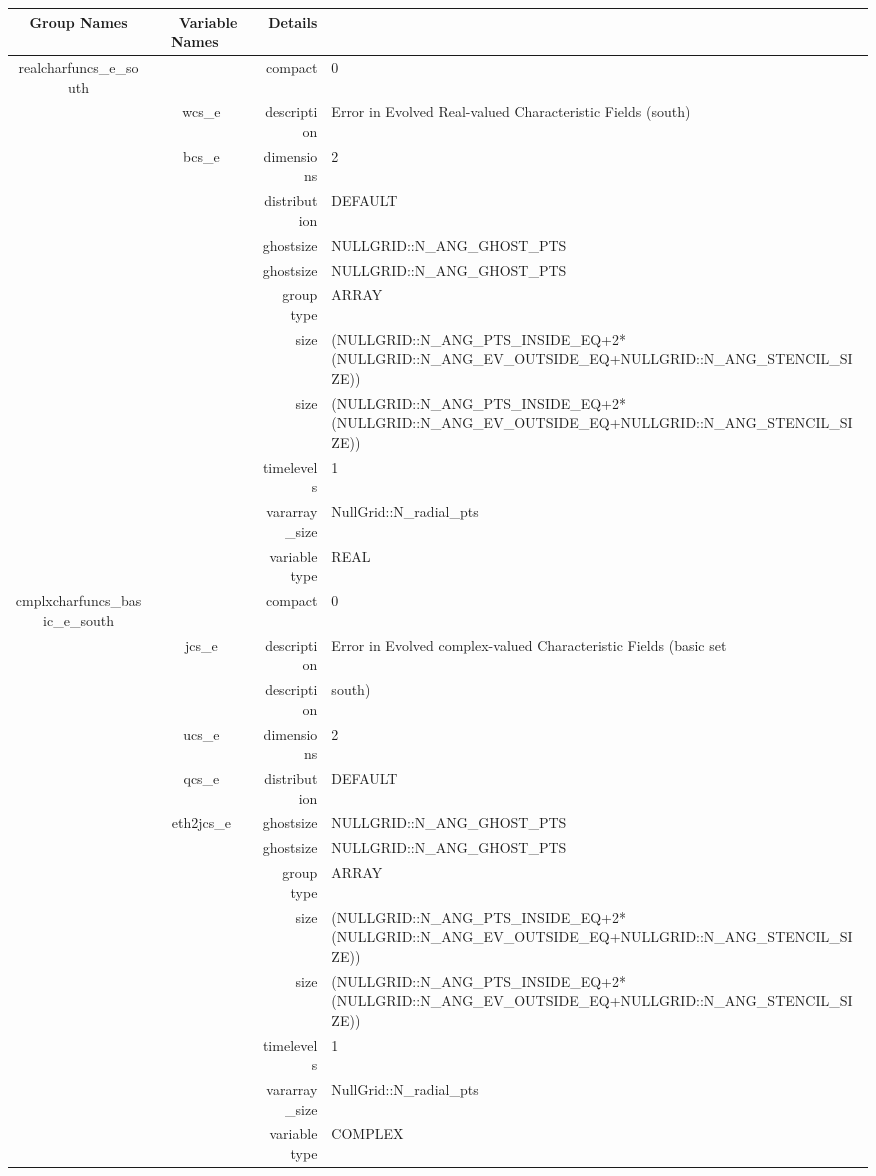 \begin{tabular*}{150mm}{|c|c@{\extracolsep{\fill}}|rl|} \hline 
~ {\bf Group Names} ~ & ~ {\bf Variable Names} ~  &{\bf Details} ~ & ~ \\ 
\hline 
realcharfuncs\_e\_south &  & compact & 0 \\ 
 & wcs\_e & description & Error in Evolved Real-valued Characteristic Fields (south) \\ 
 & bcs\_e & dimensions & 2 \\ 
 &  & distribution & DEFAULT \\ 
 &  & ghostsize & NULLGRID::N\_ANG\_GHOST\_PTS \\ 
& ~ & ghostsize & NULLGRID::N\_ANG\_GHOST\_PTS \\ 
 &  & group type & ARRAY \\ 
 &  & size & (NULLGRID::N\_ANG\_PTS\_INSIDE\_EQ+2*(NULLGRID::N\_ANG\_EV\_OUTSIDE\_EQ+NULLGRID::N\_ANG\_STENCIL\_SIZE)) \\ 
& ~ & size & (NULLGRID::N\_ANG\_PTS\_INSIDE\_EQ+2*(NULLGRID::N\_ANG\_EV\_OUTSIDE\_EQ+NULLGRID::N\_ANG\_STENCIL\_SIZE)) \\ 
 &  & timelevels & 1 \\ 
 &  & vararray\_size & NullGrid::N\_radial\_pts \\ 
 &  & variable type & REAL \\ 
\hline 
cmplxcharfuncs\_basic\_e\_south &  & compact & 0 \\ 
 & jcs\_e & description & Error in Evolved complex-valued Characteristic Fields (basic set \\ 
& ~ & description &  south) \\ 
 & ucs\_e & dimensions & 2 \\ 
 & qcs\_e & distribution & DEFAULT \\ 
 & eth2jcs\_e & ghostsize & NULLGRID::N\_ANG\_GHOST\_PTS \\ 
& ~ & ghostsize & NULLGRID::N\_ANG\_GHOST\_PTS \\ 
 &  & group type & ARRAY \\ 
 &  & size & (NULLGRID::N\_ANG\_PTS\_INSIDE\_EQ+2*(NULLGRID::N\_ANG\_EV\_OUTSIDE\_EQ+NULLGRID::N\_ANG\_STENCIL\_SIZE)) \\ 
& ~ & size & (NULLGRID::N\_ANG\_PTS\_INSIDE\_EQ+2*(NULLGRID::N\_ANG\_EV\_OUTSIDE\_EQ+NULLGRID::N\_ANG\_STENCIL\_SIZE)) \\ 
 &  & timelevels & 1 \\ 
 &  & vararray\_size & NullGrid::N\_radial\_pts \\ 
 &  & variable type & COMPLEX \\ 

\end{tabular*}
